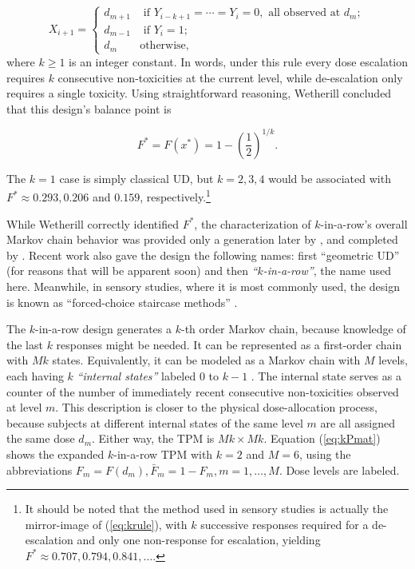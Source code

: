 \begin{equation}\label{eq:krule}
 X_{i+1}=
 \begin{cases}
d_{m+1} &\textrm{ if $Y_{i-k+1}=\cdots=Y_i=0$}, \textrm{ all observed at $d_m$};\\
d_{m-1} &\textrm{ if $Y_i=1$}; \\
d_m &\textrm{otherwise},
 \end{cases}
\end{equation}
\noindent where $k\geq 1$ is an integer constant. In words, under this rule every dose escalation requires $k$ consecutive non-toxicities at the current level, while de-escalation only requires a single toxicity. Using straightforward reasoning, Wetherill concluded that this design's balance point is

\begin{equation}\label{eq:krtarget}
 F^*=F\left(x^*\right)=1-\left(\frac {1}{2}\right)^{1/k}.
\end{equation}

\noindent The $k=1$ case is simply classical UD, but $k=2,3,4$ would be associated with $F^*\approx 0.293,0.206$ and $0.159$, respectively.\footnote{It should be noted that the method used in sensory studies is actually the mirror-image of (\ref{eq:krule}), with $k$ successive responses required for a de-escalation and only one non-response for escalation, yielding $F^*\approx 0.707,0.794,0.841,\ldots$.}

While Wetherill correctly identified $F^*$, the characterization of $k$-in-a-row's overall Markov chain behavior was provided only a generation later by \cite{Gezm:Geom:1996}, and completed by \cite{Oron:Hoff:thek:2009}. Recent work also gave the design the following names: first ``geometric UD'' (for reasons that will be apparent soon) and then \emph{``$k$-in-a-row''}\citep{Ivan:Mont:Moha:Durh:impr:2003}, the name used here. Meanwhile, in sensory studies, where it is most commonly used, the design is known as ``forced-choice staircase methods'' \citep{Treu:Mini:1995}.

The $k$-in-a-row design generates a $k$-th order Markov chain, because knowledge of the last $k$ responses might be needed. It can be represented as a first-order chain with $Mk$ states. Equivalently,  it can be modeled as a Markov chain with $M$ levels, each having $k$ \emph{``internal states''} labeled $0$ to $k-1$ \citep{Oron:Hoff:thek:2009,Weiss:Aspe:1994}. The internal state serves as a counter of the number of immediately recent consecutive non-toxicities observed at level $m$. This description is closer to the physical dose-allocation process, because subjects at different internal states of the same level $m$ are all assigned the same dose $d_m$. Either way, the TPM is $Mk\times Mk$. Equation (\ref{eq:kPmat}) shows the expanded $k$-in-a-row TPM with $k=2$ and $M=6$, using the abbreviations $F_m=F\left(d_m\right),\bar{F}_m=1-F_m, m=1,\ldots,M$. Dose levels are labeled.

